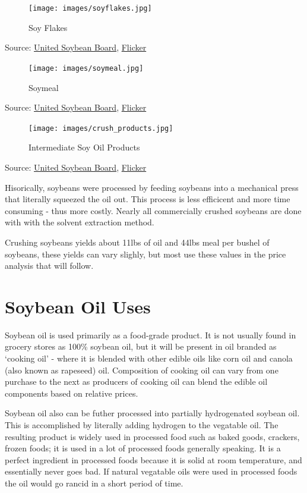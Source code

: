 \documentclass[
]{book}
\begin{document}
\begin{figure}
\centering
\texttt{[image: images/soyflakes.jpg]}
\caption{Soy Flakes}
\end{figure}

Source: \href{http://unitedsoybean.org/}{United Soybean Board}, \href{https://www.flickr.com/photos/unitedsoybean/10059015936/}{Flicker}

\begin{figure}
\centering
\texttt{[image: images/soymeal.jpg]}
\caption{Soymeal}
\end{figure}

Source: \href{http://unitedsoybean.org/}{United Soybean Board}, \href{https://www.flickr.com/photos/unitedsoybean/10059074033/}{Flicker}

\begin{figure}
\centering
\texttt{[image: images/crush\_products.jpg]}
\caption{Intermediate Soy Oil Products}
\end{figure}

Source: \href{http://unitedsoybean.org/}{United Soybean Board}, \href{https://www.flickr.com/photos/unitedsoybean/10058954054/}{Flicker}

Hisorically, soybeans were processed by feeding soybeans into a mechanical press that literally squeezed the oil out. This process is less efficicent and more time consuming - thus more costly. Nearly all commercially crushed soybeans are done with with the solvent extraction method.

Crushing soybeans yields about 11lbs of oil and 44lbs meal per bushel of soybeans, these yields can vary slighly, but most use these values in the price analysis that will follow.

\hypertarget{soybean-oil-uses}{%
\section{Soybean Oil Uses}\label{soybean-oil-uses}}

Soybean oil is used primarily as a food-grade product. It is not usually found in grocery stores as 100\% soybean oil, but it will be present in oil branded as `cooking oil' - where it is blended with other edible oils like corn oil and canola (also known as rapeseed) oil. Composition of cooking oil can vary from one purchase to the next as producers of cooking oil can blend the edible oil components based on relative prices.

Soybean oil also can be futher processed into partially hydrogenated soybean oil. This is accomplished by literally adding hydrogen to the vegatable oil. The resulting product is widely used in processed food such as baked goods, crackers, frozen foods; it is used in a lot of processed foods generally speaking. It is a perfect ingredient in processed foods because it is solid at room temperature, and essentially never goes bad. If natural vegatable oils were used in processed foods the oil would go rancid in a short period of time.
\end{document}
